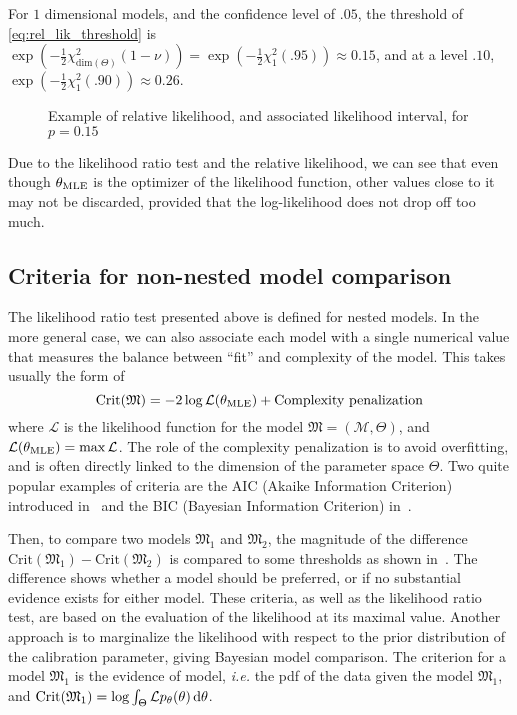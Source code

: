 \documentclass[../../Main_ManuscritThese.tex]{subfiles}
\newcommand\imgpath{/home/victor/acadwriting/Manuscrit/Text/Chapter2/img/}
\begin{document}
For $1$ dimensional models, and the confidence level of $.05$, the threshold of \cref{eq:rel_lik_threshold} is $\exp\left(-\frac{1}{2}\chi^2_{\mathrm{dim}(\Theta)}(1-\nu)\right) = \exp\left(-\frac{1}{2}\chi^2_{1}(.95)\right) \approx 0.15$, and at a level $.10$, $\exp\left(-\frac{1}{2}\chi^2_{1}(.90)\right) \approx 0.26$.

\begin{figure}[ht]
  \centering
  \label{fig:label} 
  
  \caption{Example of relative likelihood, and associated likelihood interval, for $p=0.15$}
\end{figure}

Due to the likelihood ratio test and the relative likelihood, we can see that even though ${\theta}_{\mathrm{MLE}}$ is the optimizer of the likelihood function, other values close to it may not be discarded, provided that the log-likelihood does not drop off too much.

\subsection{Criteria for non-nested model comparison}
\label{sec:criteria_AIC}
The likelihood ratio test presented above is defined for nested models. In the more general case, we can also associate each model with a single numerical value that measures the balance between ``fit'' and complexity of the model. This takes usually the form of
\begin{equation}
  \mathrm{Crit}(\mathfrak{M})=-2 \log \mathcal{L} ({\theta}_{\mathrm{MLE}}) + \text{Complexity penalization}
\end{equation}
where $\mathcal{L}$ is the likelihood function for the model $\mathfrak{M} = (\mathcal{M},\Theta)$, and $\mathcal{L}({\theta}_{\mathrm{MLE}}) = \max \mathcal{L}$. The role of the complexity penalization is to avoid overfitting, and is often directly linked to the dimension of the parameter space $\Theta$.
Two quite popular examples of criteria are the AIC (Akaike Information Criterion) introduced in~\cite{akaike_new_1974} and the BIC (Bayesian Information Criterion) in~\cite{schwarz_estimating_1978}.

Then, to compare two models $\mathfrak{M}_1$ and $\mathfrak{M}_2$, the magnitude of the difference $\mathrm{Crit}(\mathfrak{M}_1) - \mathrm{Crit}(\mathfrak{M}_2)$ is compared to some thresholds as shown in~\cite{burnham_multimodel_2004}.
The difference shows whether a model should be preferred, or if no substantial evidence exists for either model.
These criteria, as well as the likelihood ratio test, are based on the evaluation of the likelihood at its maximal value. Another approach is to marginalize the likelihood with respect to the prior distribution of the calibration parameter, giving Bayesian model comparison. The criterion for a model $\mathfrak{M}_1$ is the evidence of model, \emph{i.e.} the pdf of the data given the model $\mathfrak{M}_1$, and $\mathrm{Crit}(\mathfrak{M}_1) = \log \int_\Theta \mathcal{L} p_\theta(\theta)\,\mathrm{d}\theta$.
\end{document}
